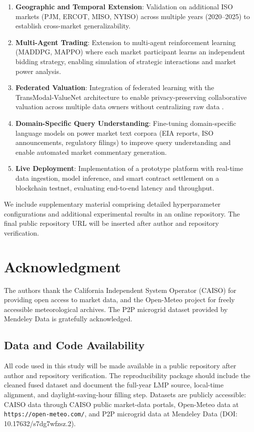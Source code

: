 \documentclass{ieeeaccess}
\begin{document}
\begin{enumerate}
  \item \textbf{Geographic and Temporal Extension}: Validation on additional ISO markets (PJM, ERCOT, MISO, NYISO) across multiple years (2020--2025) to establish cross-market generalizability.

  \item \textbf{Multi-Agent Trading}: Extension to multi-agent reinforcement learning (MADDPG, MAPPO) where each market participant learns an independent bidding strategy, enabling simulation of strategic interactions and market power analysis.

  \item \textbf{Federated Valuation}: Integration of federated learning with the TransModal-ValueNet architecture to enable privacy-preserving collaborative valuation across multiple data owners without centralizing raw data \cite{b33}.

  \item \textbf{Domain-Specific Query Understanding}: Fine-tuning domain-specific language models on power market text corpora (EIA reports, ISO announcements, regulatory filings) to improve query understanding and enable automated market commentary generation.

  \item \textbf{Live Deployment}: Implementation of a prototype platform with real-time data ingestion, model inference, and smart contract settlement on a blockchain testnet, evaluating end-to-end latency and throughput.
\end{enumerate}

\appendices

We include supplementary material comprising detailed hyperparameter configurations and additional experimental results in an online repository. The final public repository URL will be inserted after author and repository verification.

\section*{Acknowledgment}

The authors thank the California Independent System Operator (CAISO) for providing open access to market data, and the Open-Meteo project for freely accessible meteorological archives. The P2P microgrid dataset provided by Mendeley Data is gratefully acknowledged.

\subsection*{Data and Code Availability}
All code used in this study will be made available in a public repository after author and repository verification. The reproducibility package should include the cleaned fused dataset and document the full-year LMP source, local-time alignment, and daylight-saving-hour filling step. Datasets are publicly accessible: CAISO data through CAISO public market-data portals, Open-Meteo data at \texttt{https://open-meteo.com/}, and P2P microgrid data at Mendeley Data (DOI: 10.17632/s7dg7wfzsz.2).
\end{document}
